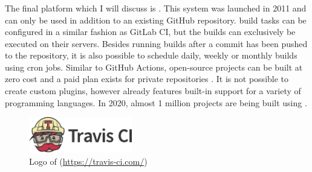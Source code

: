 
\subsubsection{\travisci}\label{sssec:travisci}
The final \CI{} platform which I will discuss is \travisci{}. This \CI{} system was launched in 2011 and can only be used in addition to an existing GitHub repository. \travisci{} build tasks can be configured in a similar fashion as GitLab CI, but the builds can exclusively be executed on their servers. Besides running builds after a commit has been pushed to the repository, it is also possible to schedule daily, weekly or monthly builds using cron jobs. Similar to GitHub Actions, open-source projects can be built at zero cost and a paid plan exists for private repositories \cite{travisanalysis}. It is not possible to create custom plugins, however \travisci{} already features built-in support for a variety of programming languages. In 2020, almost 1 million projects are being built using \travisci{} \cite{travis2020}.

\begin{figure}[htbp!]
	\centering
	\includegraphics[width=0.40\textwidth]{assets/images/travis-ci.pdf}
	\caption{Logo of \travisci{} (\url{https://travis-ci.com/})}
	\label{fig:travis-ci}
\end{figure}
